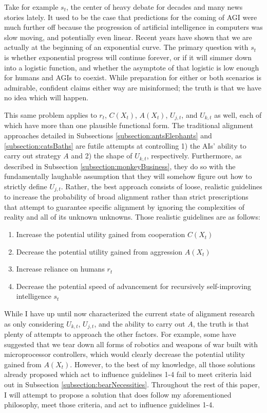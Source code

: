\documentclass{article}[10pt]
\begin{document}
Take for example $s_t$, the center of heavy debate for decades and many news stories lately.
It used to be the case that predictions for the coming of AGI were much further off because the progression of artificial intelligence in computers was slow moving, and potentially even linear.
Recent years have shown that we are actually at the beginning of an exponential curve.
The primary question with $s_t$ is whether exponential progress will continue forever, or if it will simmer down into a logistic function, and whether the asymptote of that logistic is low enough for humans and AGIs to coexist.
While preparation for either or both scenarios is admirable, confident claims either way are misinformed; the truth is that we have no idea which will happen.\par

This same problem applies to $r_t$, $C(X_t)$, $A(X_t)$, $U_{j,t}$, and $U_{k,t}$ as well, each of which have more than one plausible functional form.
The traditional alignment approaches detailed in Subsections \ref{subsection:antsElephants} and \ref{subsection:catsBaths} are futile attempts at controlling 1) the AIs' ability to carry out strategy $A$ and 2) the shape of $U_{k,t}$, respectively.
Furthermore, as described in Subsection \ref{subsection:monkeyBusiness}, they do so with the fundamentally laughable assumption that they will somehow figure out how to strictly define $U_{j,t}$.
Rather, the best approach consists of loose, realistic guidelines to increase the probability of broad alignment rather than strict prescriptions that attempt to guarantee specific alignment by ignoring the complexities of reality and all of its unknown unknowns.
Those realistic guidelines are as follows:\par
\begin{enumerate}
    \item Increase the potential utility gained from cooperation $C(X_t)$
    \item Decrease the potential utility gained from aggression $A(X_t)$
    \item Increase reliance on humans $r_t$
    \item Decrease the potential speed of advancement for recursively self-improving intelligence $s_t$
\end{enumerate}

While I have up until now characterized the current state of alignment research as only considering $U_{k,t}$, $U_{j,t}$, and the ability to carry out $A$, the truth is that plenty of attempts to approach the other factors.
For example, some have suggested that we tear down all forms of robotics and weapons of war built with microprocessor controllers, which would clearly decrease the potential utility gained from $A(X_t)$.
However, to the best of my knowledge, all those solutions already proposed which act to influence guidelines 1-4 fail to meet criteria laid out in Subsection \ref{subsection:bearNecessities}.
Throughout the rest of this paper, I will attempt to propose a solution that does follow my aforementioned philosophy, meet those criteria, and act to influence guidelines 1-4.
\end{document}
